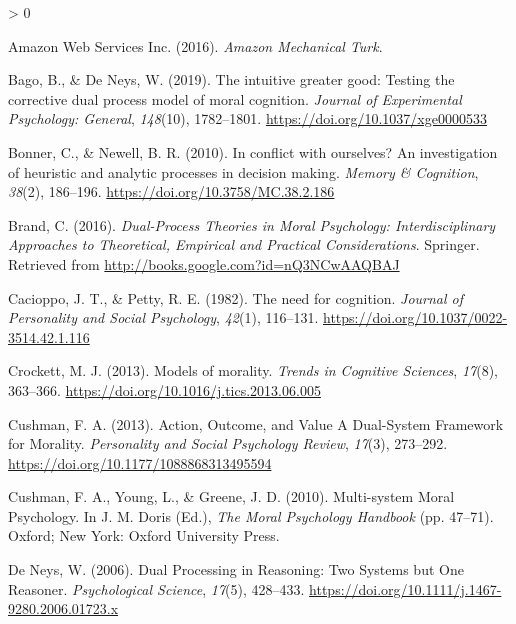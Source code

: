 \documentclass[
  american,
  man,floatsintext]{apa7}
\newlength{\cslhangindent}
\newenvironment{CSLReferences}[2] %
 {%
  \setlength{\parindent}{0pt}
  \ifodd #1 \everypar{\setlength{\hangindent}{\cslhangindent}}\ignorespaces\fi
  \ifnum #2 > 0
  \setlength{\parskip}{#2\baselineskip}
  \fi
 }%
 {}
\begin{document}
\hypertarget{refs}{}
\begin{CSLReferences}{1}{0}
\leavevmode\hypertarget{ref-amazonwebservicesinc._amazon_2016}{}%
Amazon Web Services Inc. (2016). \emph{Amazon {Mechanical Turk}}.

\leavevmode\hypertarget{ref-bago_intuitive_2019}{}%
Bago, B., \& De Neys, W. (2019). The intuitive greater good: Testing the corrective dual process model of moral cognition. \emph{Journal of Experimental Psychology: General}, \emph{148}(10), 1782--1801. \url{https://doi.org/10.1037/xge0000533}

\leavevmode\hypertarget{ref-bonner_conflict_2010}{}%
Bonner, C., \& Newell, B. R. (2010). In conflict with ourselves? An investigation of heuristic and analytic processes in decision making. \emph{Memory \& Cognition}, \emph{38}(2), 186--196. \url{https://doi.org/10.3758/MC.38.2.186}

\leavevmode\hypertarget{ref-brand_dualprocess_2016}{}%
Brand, C. (2016). \emph{Dual-{Process Theories} in {Moral Psychology}: Interdisciplinary {Approaches} to {Theoretical}, {Empirical} and {Practical Considerations}}. {Springer}. Retrieved from \url{http://books.google.com?id=nQ3NCwAAQBAJ}

\leavevmode\hypertarget{ref-cacioppo_need_1982}{}%
Cacioppo, J. T., \& Petty, R. E. (1982). The need for cognition. \emph{Journal of Personality and Social Psychology}, \emph{42}(1), 116--131. \url{https://doi.org/10.1037/0022-3514.42.1.116}

\leavevmode\hypertarget{ref-crockett_models_2013}{}%
Crockett, M. J. (2013). Models of morality. \emph{Trends in Cognitive Sciences}, \emph{17}(8), 363--366. \url{https://doi.org/10.1016/j.tics.2013.06.005}

\leavevmode\hypertarget{ref-cushman_action_2013}{}%
Cushman, F. A. (2013). Action, {Outcome}, and {Value A Dual}-{System Framework} for {Morality}. \emph{Personality and Social Psychology Review}, \emph{17}(3), 273--292. \url{https://doi.org/10.1177/1088868313495594}

\leavevmode\hypertarget{ref-cushman_multisystem_2010}{}%
Cushman, F. A., Young, L., \& Greene, J. D. (2010). Multi-system {Moral Psychology}. In J. M. Doris (Ed.), \emph{The {Moral Psychology Handbook}} (pp. 47--71). {Oxford; New York}: {Oxford University Press}.

\leavevmode\hypertarget{ref-deneys_dual_2006}{}%
De Neys, W. (2006). Dual {Processing} in {Reasoning}: Two {Systems} but {One Reasoner}. \emph{Psychological Science}, \emph{17}(5), 428--433. \url{https://doi.org/10.1111/j.1467-9280.2006.01723.x}


\end{CSLReferences}
\end{document}
